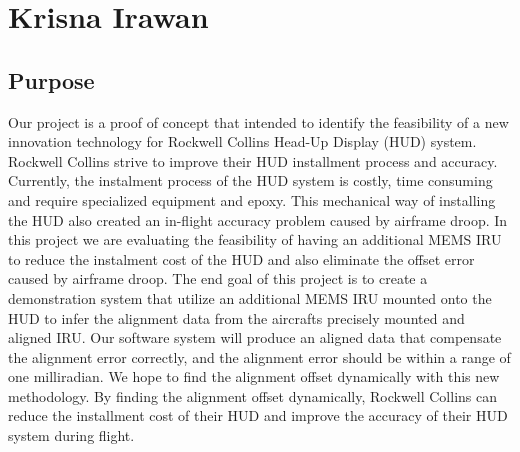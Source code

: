 \section{Krisna Irawan}
\subsection{Purpose}
Our project is a proof of concept that intended to identify the feasibility of a new innovation technology for Rockwell Collins Head-Up Display (HUD) system. Rockwell Collins strive to improve their HUD installment process and accuracy. Currently, the instalment process of the HUD system is costly, time consuming and require specialized equipment and epoxy. This mechanical way of installing the HUD also created an in-flight accuracy problem caused by airframe droop. In this project we are evaluating the feasibility of having an additional MEMS IRU to reduce the instalment cost of the HUD and also eliminate the offset error caused by airframe droop. The end goal of this project is to create a demonstration system that utilize an additional MEMS IRU mounted onto the HUD to infer the alignment data from the aircrafts precisely mounted and aligned IRU. Our software system will produce an aligned data that compensate the alignment error correctly, and the alignment error should be within a range of one milliradian. We hope to find the alignment offset dynamically with this new methodology. By finding the alignment offset dynamically, Rockwell Collins can reduce the installment cost of their HUD and improve the accuracy of their HUD system during flight. 

